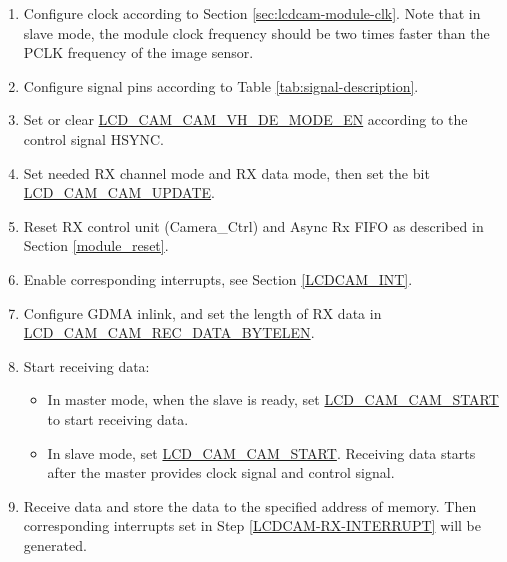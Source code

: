 \documentclass[main\_\_EN.tex]{subfiles}
\begin{document}
\begin{enumerate}
    \item Configure clock according to Section \ref{sec:lcdcam-module-clk}. Note that in slave mode, the module clock frequency should be two times faster than the PCLK frequency of the image sensor.

    \item Configure signal pins according to Table \ref{tab:signal-description}.

    \item Set or clear  \hyperref[fielddesc:LCDCAMCAMVHDEMODEEN]{LCD\_CAM\_CAM\_VH\_DE\_MODE\_EN} according to the control signal HSYNC.
    \item Set needed RX channel mode and RX data mode, then set the bit \hyperref[fielddesc:LCDCAMCAMUPDATE]{LCD\_CAM\_CAM\_UPDATE}.

    \item Reset RX control unit (Camera\_Ctrl) and Async Rx FIFO as described in Section \ref{module_reset}.
    \item Enable corresponding interrupts, see Section  \ref{LCDCAM_INT}.\label{LCDCAM-RX-INTERRUPT}

    \item Configure GDMA inlink, and set the length of RX data in \hyperref[fielddesc:LCDCAMCAMRECDATABYTELEN]{LCD\_CAM\_CAM\_REC\_DATA\_BYTELEN}.

    \item Start receiving data:
    \begin{itemize}
        \item In master mode, when the slave is ready, set \hyperref[fielddesc:LCDCAMCAMSTART]{LCD\_CAM\_CAM\_START} to start receiving data.
        \item In slave mode, set \hyperref[fielddesc:LCDCAMCAMSTART]{LCD\_CAM\_CAM\_START}. Receiving data starts after the master provides clock signal and control signal.
    \end{itemize}
    \item Receive data and store the data to the specified address of \chipname{} memory. Then corresponding interrupts set in Step \ref{LCDCAM-RX-INTERRUPT} will be generated.
\end{enumerate}
\end{document}
